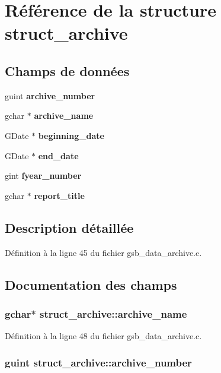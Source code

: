 \section{Référence de la structure struct\_\-archive}
\label{structstruct__archive}
\subsection*{Champs de données}
\begin{DoxyCompactItemize}
\item 
guint {\bf archive\_\-number}
\item 
gchar $\ast$ {\bf archive\_\-name}
\item 
GDate $\ast$ {\bf beginning\_\-date}
\item 
GDate $\ast$ {\bf end\_\-date}
\item 
gint {\bf fyear\_\-number}
\item 
gchar $\ast$ {\bf report\_\-title}
\end{DoxyCompactItemize}


\subsection{Description détaillée}


Définition à la ligne 45 du fichier gsb\_\-data\_\-archive.c.



\subsection{Documentation des champs}
\subsubsection[{archive\_\-name}]{\setlength{\rightskip}{0pt plus 5cm}gchar$\ast$ {\bf struct\_\-archive::archive\_\-name}}\label{structstruct__archive_ad553941134c01a78c2e596d4e17056b7}


Définition à la ligne 48 du fichier gsb\_\-data\_\-archive.c.

\subsubsection[{archive\_\-number}]{\setlength{\rightskip}{0pt plus 5cm}guint {\bf struct\_\-archive::archive\_\-number}}\label{structstruct__archive_a00bff48e5a1ec17c530d7597b22a739b}


